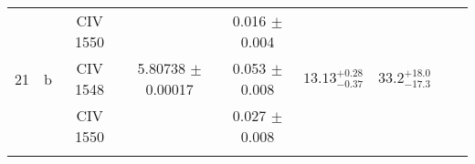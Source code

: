 \documentclass[12pt]{article}
\begin{document}
\begin{footnotesize}
\begin{longtable}{ c c c c c c c c c}
  &   & CIV     1550  &  &  0.016 $\pm$ 0.004   &   &     & 	 & \\ 
      21  & b  & CIV     1548  &  5.80738 $\pm$ 0.00017  &  0.053 $\pm$ 0.008   & $13.13_{ - 0.37}^{ + 0.28}$  & $33.2_{ - 17.3}^{ + 18.0}$    & 	 & \\ 
  &   & CIV     1550  &  &  0.027 $\pm$ 0.008   &   &     & 	 & \\ 
 &        &                   &                &   & 					&							&   	 	& \\  
\hline                                                                                                           
\hline                                                                                                           
\end{longtable}                                                                                                  
\end{footnotesize}                                                                                                  
\end{document}
